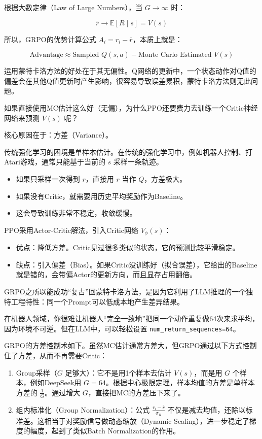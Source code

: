 根据大数定律（Law of Large Numbers），当 \(G\to\infty\) 时：

\[
\bar{r}\to \mathbb{E}[R\mid s]=V(s)
\]

所以，GRPO的优势计算公式 \(A_i=r_i-\bar{r}\)，本质上就是：

\[
\text{Advantage}\approx \text{Sampled }Q(s,a)-\text{Monte Carlo Estimated }V(s)
\]

运用蒙特卡洛方法的好处在于其无偏性。Q网络的更新中，一个状态动作对Q值的偏差会在其他Q值更新时产生影响，很容易导致误差累积，蒙特卡洛方法则无此问题。

如果直接使用MC估计这么好（无偏），为什么PPO还要费力去训练一个Critic神经网络来预测 \(V(s)\) 呢？

核心原因在于：方差（Variance）。

传统强化学习的困境是单样本估计。在传统的强化学习中，例如机器人控制、打Atari游戏，通常只能基于当前的 \(s\) 采样一条轨迹。

\begin{itemize}
\tightlist
\item
  如果只采样一次得到 \(r\)，直接用 \(r\) 当作 \(Q\)，方差极大。
\item
  如果没有Critic，就需要用历史平均奖励作为Baseline。
\item
  这会导致训练非常不稳定，收敛缓慢。
\end{itemize}

PPO采用Actor-Critic解法，引入Critic网络 \(V_{\phi}(s)\)：

\begin{itemize}
\tightlist
\item
  优点：降低方差。Critic见过很多类似的状态，它的预测比较平滑稳定。
\item
  缺点：引入偏差（Bias）。如果Critic没训练好（拟合误差），它给出的Baseline就是错的，会带偏Actor的更新方向，而且显存占用翻倍。
\end{itemize}

GRPO之所以能成功``复古''回蒙特卡洛方法，是因为它利用了LLM推理的一个独特工程特性：同一个Prompt可以低成本地产生差异结果。

在机器人领域，你很难让机器人``完全一致地''把同一个动作重复做64次来求平均，因为环境不可逆。但在LLM中，可以轻松设置 \texttt{num\_return\_sequences=64}。

GRPO的方差控制术如下。虽然MC估计通常方差大，但GRPO通过以下方式控制住了方差，从而不再需要Critic：

\begin{enumerate}
\def\labelenumi{\arabic{enumi}.}
\tightlist
\item
  Group采样（\(G\) 足够大）：它不是用1个样本去估计 \(V(s)\)，而是用 \(G\) 个样本，例如DeepSeek用 \(G=64\)。根据中心极限定理，样本均值的方差是单样本方差的 \(\frac{1}{G}\)。通过增大 \(G\)，直接把MC的方差压下来了。
\item
  组内标准化（Group Normalization）：公式 \(\frac{r_i-\bar{r}}{\sigma_R}\) 不仅是减去均值，还除以标准差。这相当于对奖励信号做动态缩放（Dynamic Scaling），进一步稳定了梯度的幅度，起到了类似Batch Normalization的作用。
\end{enumerate}

